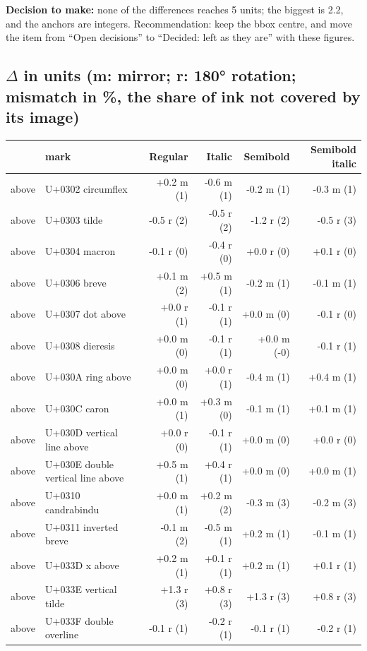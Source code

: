\documentclass[10pt]{article}
\begin{document}
\textbf{Decision to make:} none of the differences reaches 5 units; the biggest is 2.2, and the anchors are integers.
Recommendation: keep the bbox centre, and move the item from ``Open decisions'' to ``Decided: left as they are'' with these figures.

\subsection*{$\Delta$ in units (m: mirror; r: 180° rotation; mismatch in \%, the share of ink not covered by its image)}
{\small\begin{longtable}{@{}llrrrr@{}}
 & mark & Regular & Italic & Semibold & Semibold italic\\\hline\endhead

above & U+0302 circumflex & +0.2 m (1) & -0.6 m (1) & -0.2 m (1) & -0.3 m (1)\\
above & U+0303 tilde & -0.5 r (2) & -0.5 r (2) & -1.2 r (2) & -0.5 r (3)\\
above & U+0304 macron & -0.1 r (0) & -0.4 r (0) & +0.0 r (0) & +0.1 r (0)\\
above & U+0306 breve & +0.1 m (2) & +0.5 m (1) & -0.2 m (1) & -0.1 m (1)\\
above & U+0307 dot above & +0.0 r (1) & -0.1 r (1) & +0.0 m (0) & -0.1 r (0)\\
above & U+0308 dieresis & +0.0 m (0) & -0.1 r (1) & +0.0 m (-0) & -0.1 r (1)\\
above & U+030A ring above & +0.0 m (0) & +0.0 r (1) & -0.4 m (1) & +0.4 m (1)\\
above & U+030C caron & +0.0 m (1) & +0.3 m (0) & -0.1 m (1) & +0.1 m (1)\\
above & U+030D vertical line above & +0.0 r (0) & -0.1 r (1) & +0.0 m (0) & +0.0 r (0)\\
above & U+030E double vertical line above & +0.5 m (1) & +0.4 r (1) & +0.0 m (0) & +0.0 m (1)\\
above & U+0310 candrabindu & +0.0 m (1) & +0.2 m (2) & -0.3 m (3) & -0.2 m (3)\\
above & U+0311 inverted breve & -0.1 m (2) & -0.5 m (1) & +0.2 m (1) & -0.1 m (1)\\
above & U+033D x above & +0.2 m (1) & +0.1 r (1) & +0.2 m (1) & +0.1 r (1)\\
above & U+033E vertical tilde & +1.3 r (3) & +0.8 r (3) & +1.3 r (3) & +0.8 r (3)\\
above & U+033F double overline & -0.1 r (1) & -0.2 r (1) & -0.1 r (1) & -0.2 r (1)\\

\end{longtable}}
\end{document}
